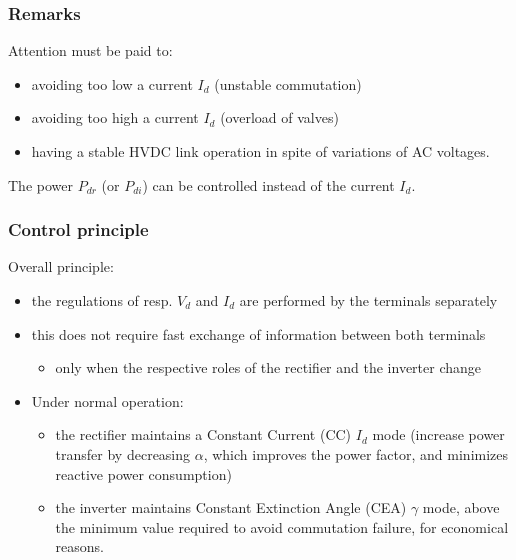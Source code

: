 \begin{frame}
\frametitle{Remarks}
Attention must be paid to:
\begin{itemize}
    \item avoiding too low a current $I_d$ (unstable commutation)
    \item avoiding too high a current $I_d$ (overload of valves)
    \item having a stable HVDC link operation in spite of variations of AC voltages.
\end{itemize}
The power $P_{dr}$ (or $P_{di}$) can be controlled instead of the current $I_d$.
\end{frame}

\begin{frame}
\frametitle{Control principle}
Overall principle:
\begin{itemize}
    \item the regulations of resp. $V_d$ and $I_d$ are performed by the terminals separately
    \item this does not require fast exchange of information between both terminals
    \begin{itemize}
        \item only when the respective roles of the rectifier and the inverter change
    \end{itemize}
    \item Under normal operation:
    \begin{itemize}
        \item the rectifier maintains a Constant Current (CC) $I_d$ mode (increase power transfer by decreasing $\alpha$, which improves the power factor, and minimizes reactive power consumption)
        \item the inverter maintains Constant Extinction Angle (CEA) $\gamma$ mode, above the minimum value required to avoid commutation failure, for economical reasons.
    \end{itemize}
\end{itemize}
\end{frame}

